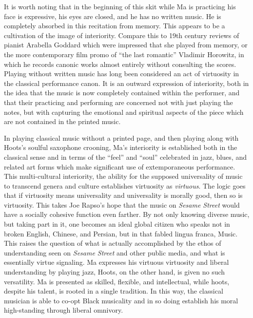 \documentclass[12pt,letterpaper]{article}
\newcommand{\ses}{\textit{Sesame Street }}
\begin{document}
	It is worth noting that in the beginning of this skit while Ma is 
	practicing his face is expressive, his eyes are closed, and he has no 
	written music. He is completely absorbed in this recitation from memory.
	This appears to be a cultivation of the image of interiority. Compare
	this to 19th century reviews of pianist Arabella Goddard which were 
	impressed that she played from memory,\autocite{Goddard} or the more 
	contemporary film promo of ``the last romantic'' Vladimir Horowitz, in 
	which he records canonic works almost entirely without consulting the 
	scores. Playing without written music has long been considered an act of
	virtuosity in the classical performance canon. It is an outward 
	expression of interiority, both in the idea that the music is now 
	completely contained within the performer, and that their practicing and
	performing are concerned not with just playing the notes, but 
	with capturing the emotional and spiritual aspects of the piece which 
	are not contained in the printed music. 

	In playing classical music without a printed page, and then playing 
	along with Hoots's soulful saxophone crooning, Ma's interiority is 
	established both in the classical sense and in terms of the ``feel'' and
	``soul'' celebrated in jazz, blues, and related art forms which make 
	significant use of extemporaneous performance. This multi-cultural 
	interiority, the ability for the supposed universality of music to 
	transcend 
	genera and culture establishes virtuosity as \textit{virtuous}.
	The logic goes that if virtuosity means universality and universality is
	morally good, then so is virtuosity. This takes Joe Rapso's hope that 
	the music on \textit{Sesame Street} would have a socially cohesive 
	function even farther. By not only knowing diverse music, but taking 
	part in it, one becomes an ideal global citizen who speaks not in broken
	English, Chinese, and Persian, but in that fabled lingua franca, Music.   
	This raises the question of what is actually accomplished by the ethos
	of understanding seen on \ses and other public media, and what is
	essentially virtue signaling. Ma expresses his virtuous virtuosity and 
	liberal understanding by playing jazz, Hoots, on the other hand, is 
	given no such versatility. Ma is presented as skilled, flexible, and 
	intellectual, while hoots, despite his talent, is rooted in a single 
	tradition. In this way, the classical musician is able to co-opt Black 
	musicality and in so doing establish his moral high-standing through 
	liberal omnivory. 
\end{document}
